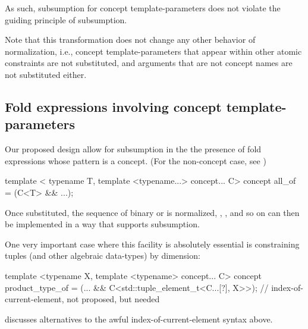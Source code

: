\documentclass{wg21}
\begin{document}
As such, subsumption for concept template-parameters does not violate the guiding principle of subsumption.


Note that this transformation does not change any other behavior of normalization, i.e., concept template-parameters that appear within other atomic constraints
are not substituted, and arguments that are not concept names are not substituted either.

\subsection{Fold expressions involving concept template-parameters}

Our proposed design allow for subsumption in the the presence of fold expressions whose pattern is a concept.
(For the non-concept case, see )


\begin{colorblock}
template <
    typename T,
    template <typename...> concept... C>
concept all_of = (C<T> && ...);
\end{colorblock}

Once substituted, the sequence of binary \tcode{\&\&} or \tcode{||} is normalized,
, , and so on can then be implemented in a way that supports subsumption.

One very important case where this facility is absolutely essential is constraining tuples (and other algebraic data-types) by dimension:

\begin{colorblock}
template <typename X, template <typename> concept... C>
concept product_type_of = (... && C<std::tuple_element_t<C...[?], X>>);
//   index-of-current-element, not proposed, but needed  ~~~~~~~
\end{colorblock}

 discusses alternatives to the awful index-of-current-element syntax above.
\end{document}

